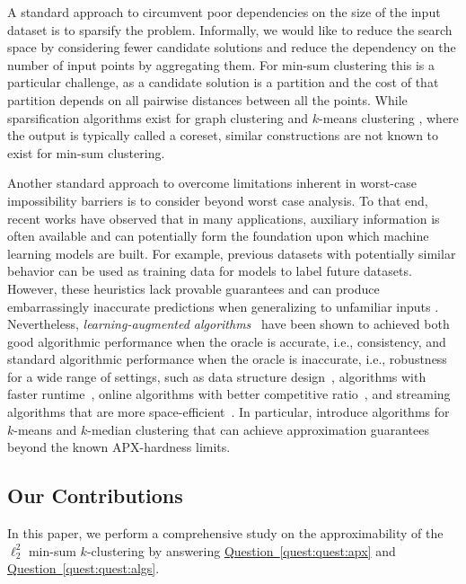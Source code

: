 \documentclass[11pt]{article}
\newcommand{\namedref}[2]{\hyperref[#2]{#1~\ref*{#2}}}
\newcommand{\questref}[1]{\namedref{Question}{quest:#1}}
\begin{document}
A standard approach to circumvent poor dependencies on the size of the input dataset is to sparsify the problem. Informally, we would like to reduce the search space by considering fewer candidate solutions and reduce the dependency on the number of input points by aggregating them.
For min-sum clustering this is a particular challenge, as a candidate solution is a partition and the cost of that partition depends on all pairwise distances between all the points.
While sparsification algorithms exist for graph clustering \cite{JambulapatiLS23,Lee23} and $k$-means clustering \cite{Cohen-AddadSS21,Cohen-AddadLSSS22}, where the output is typically called a coreset, similar constructions are not known to exist for min-sum clustering.

Another standard approach to overcome limitations inherent in worst-case impossibility barriers is to consider beyond worst case analysis. 
To that end, recent works have observed that in many applications, auxiliary information is often available and can potentially form the foundation upon which machine learning models are built. 
For example, previous datasets with potentially similar behavior can be used as training data for models to label future datasets. 
However, these heuristics lack provable guarantees and can produce embarrassingly inaccurate predictions when generalizing to unfamiliar inputs \cite{SzegedyZSBEGF13}. 
Nevertheless, \emph{learning-augmented algorithms}~\cite{MitzenmacherV20} have been shown to achieved both good algorithmic performance when the oracle is accurate, i.e., consistency, and standard algorithmic performance when the oracle is inaccurate, i.e., robustness for a wide range of settings, such as data structure design~\cite{KraskaBCDP18,Mitzenmacher18,LinLW22}, algorithms with faster runtime~\cite{DinitzILMV21,ChenSVZ22,DaviesMVW23}, online algorithms with better competitive ratio~\cite{PurohitSK18,GollapudiP19,LattanziLMV20,WangLW20,WeiZ20,BamasMS20,ImKQP21,LykourisV21,AamandCI22,Anand0KP22,AzarPT22,GrigorescuLSSZ22,KhodakBTV22,JiangLLTZ22,AntoniadisCEPS23,ShinLLA23}, and streaming algorithms that are more space-efficient~\cite{HsuIKV19,IndykVY19,JiangLLRW20,ChenIW22,ChenEILNRSWWZ22,LLLVW23}. 
In particular, \cite{ErgunFSWZ22,NguyenCN23} introduce algorithms for $k$-means and $k$-median clustering that can achieve approximation guarantees beyond the known APX-hardness limits. 

\subsection{Our Contributions}
In this paper, we perform a comprehensive study on the approximability of the $\ell_2^2$ min-sum $k$-clustering by answering \questref{quest:apx} and \questref{quest:algs}. 
\end{document}
